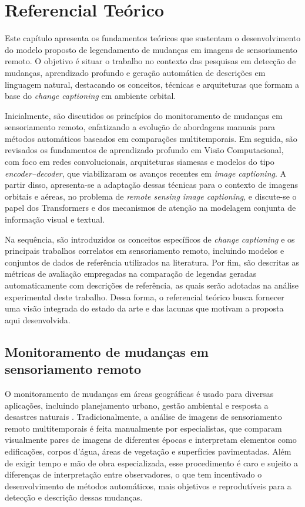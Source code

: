 \section{Referencial Teórico}
\label{referencial}

Este capítulo apresenta os fundamentos teóricos que sustentam o desenvolvimento do modelo proposto de legendamento de mudanças em imagens de sensoriamento remoto. O objetivo é situar o trabalho no contexto das pesquisas em detecção de mudanças, aprendizado profundo e geração automática de descrições em linguagem natural, destacando os conceitos, técnicas e arquiteturas que formam a base do \textit{change captioning} em ambiente orbital.

Inicialmente, são discutidos os princípios do monitoramento de mudanças em sensoriamento remoto, enfatizando a evolução de abordagens manuais para métodos automáticos baseados em comparações multitemporais. Em seguida, são revisados os fundamentos de aprendizado profundo em Visão Computacional, com foco em redes convolucionais, arquiteturas siamesas e modelos do tipo \textit{encoder--decoder}, que viabilizaram os avanços recentes em \textit{image captioning}. A partir disso, apresenta-se a adaptação dessas técnicas para o contexto de imagens orbitais e aéreas, no problema de \textit{remote sensing image captioning}, e discute-se o papel dos Transformers e dos mecanismos de atenção na modelagem conjunta de informação visual e textual.

Na sequência, são introduzidos os conceitos específicos de \textit{change captioning} e os principais trabalhos correlatos em sensoriamento remoto, incluindo modelos e conjuntos de dados de referência utilizados na literatura. Por fim, são descritas as métricas de avaliação empregadas na comparação de legendas geradas automaticamente com descrições de referência, as quais serão adotadas na análise experimental deste trabalho. Dessa forma, o referencial teórico busca fornecer uma visão integrada do estado da arte e das lacunas que motivam a proposta aqui desenvolvida.


\subsection{Monitoramento de mudanças em sensoriamento remoto}

O monitoramento de mudanças em áreas geográficas é usado para diversas aplicações, incluindo planejamento urbano, gestão ambiental e resposta a desastres naturais \cite{singh1989,lu2004}. Tradicionalmente, a análise de imagens de sensoriamento remoto multitemporais é feita manualmente por especialistas, que comparam visualmente pares de imagens de diferentes épocas e interpretam elementos como edificações, corpos d’água, áreas de vegetação e superfícies pavimentadas. Além de exigir tempo e mão de obra especializada, esse procedimento é caro e sujeito a diferenças de interpretação entre observadores, o que tem incentivado o desenvolvimento de métodos automáticos, mais objetivos e reprodutíveis para a detecção e descrição dessas mudanças.

